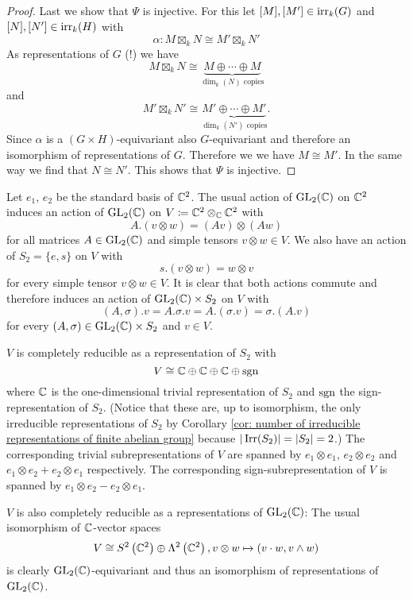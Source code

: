 \begin{proof}
 Last we show that $\Psi$ is injective. For this let $[M], [M'] \in \operatorname{irr}_k(G)$ and $[N], [N'] \in \operatorname{irr}_k(H)$ with
 \[
  \alpha \colon M \boxtimes_k N \cong M' \boxtimes_k N'
 \]
 As representations of $G$ (!) we have
 \[
  M \boxtimes_k N \cong \underbrace{M \oplus \dotsb \oplus M}_{\dim_k(N) \text{ copies}}
 \]
 and
 \[
  M' \boxtimes_k N' \cong \underbrace{M' \oplus \dotsb \oplus M'}_{\dim_k(N') \text{ copies}}.
 \]
 Since $\alpha$ is a $(G \times H)$-equivariant also $G$-equivariant and therefore an isomorphism of representations of $G$. Therefore we we have $M \cong M'$. In the same way we find that $N \cong N'$. This shows that $\Psi$ is injective.
\end{proof}


\begin{expl}
Let $e_1$, $e_2$ be the standard basis of $\mathbb{C}^2$. The usual action of $\operatorname{GL}_2(\mathbb{C})$ on $\mathbb{C}^2$ induces an action of $\operatorname{GL}_2(\mathbb{C})$ on $V \coloneqq \mathbb{C}^2 \otimes_{\mathbb{C}} \mathbb{C}^2$ with
 \[
  A.(v \otimes w) = (Av) \otimes (Aw)
 \]
 for all matrices $A \in \operatorname{GL}_2(\mathbb{C})$ and simple tensors $v \otimes w \in V$. We also have an action of $S_2 = \{e, s\}$ on $V$ with
 \[
  s.(v \otimes w) = w \otimes v
 \]
 for every simple tensor $v \otimes w \in V$. It is clear that both actions commute and therefore induces an action of $\operatorname{GL}_2(\mathbb{C}) \times S_2$ on $V$ with
 \[
  (A,\sigma).v = A.\sigma.v = A.(\sigma.v) = \sigma.(A.v)
 \]
 for every $(A,\sigma) \in \operatorname{GL}_2(\mathbb{C}) \times S_2$ and $v \in V$.
 
 $V$ is completely reducible as a representation of $S_2$ with
 \[
  V \cong \mathbb{C} \oplus \mathbb{C} \oplus \mathbb{C} \oplus \operatorname{sgn}
 \]
 where $\mathbb{C}$ is the one-dimensional trivial representation of $S_2$ and $\operatorname{sgn}$ the sign-representation of $S_2$. (Notice that these are, up to isomorphism, the only irreducible representations of $S_2$ by Corollary \ref{cor: number of irreducible representations of finite abelian group} because $|\operatorname{Irr}(S_2)| = |S_2| = 2$.) The corresponding trivial subrepresentations of $V$ are spanned by $e_1 \otimes e_1$, $e_2 \otimes e_2$ and $e_1 \otimes e_2 + e_2 \otimes e_1$ respectively. The corresponding sign-subrepresentation of $V$ is spanned by $e_1 \otimes e_2 - e_2 \otimes e_1$.
 
 $V$ is also completely reducible as a representations of $\operatorname{GL}_2(\mathbb{C})$: The usual isomorphism of $\mathbb{C}$-vector spaces
 \[
  V \cong S^2\left( \mathbb{C}^2 \right) \oplus \Lambda^2\left( \mathbb{C}^2 \right), v \otimes w \mapsto (v \cdot w, v \wedge w)
 \]
 is clearly $\operatorname{GL}_2(\mathbb{C})$-equivariant and thus an isomorphism of representations of $\operatorname{GL}_2(\mathbb{C})$.
 

\end{expl}
